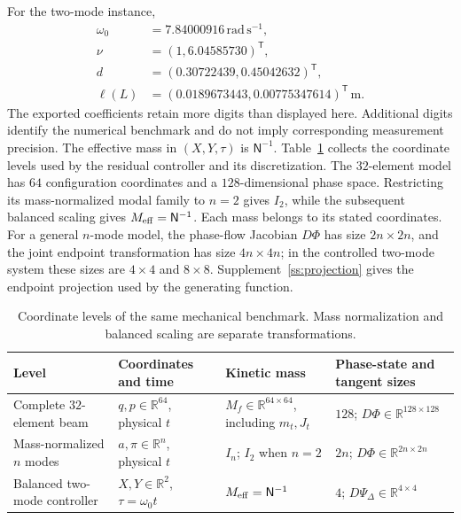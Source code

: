 For the two-mode instance,
\begin{align}
 \omega_0&=7.84000916\,\mathrm{rad\,s^{-1}},\nonumber\\
 \nu&=(1,6.04585730)^{\mathsf T},\nonumber\\
 d&=(0.30722439,0.45042632)^{\mathsf T},\nonumber\\
 \ell(L)&=(0.0189673443,0.00775347614)^{\mathsf T}\,\mathrm m.
 \label{mech:reduced-values}
\end{align}
The exported coefficients retain more digits than displayed here.
Additional digits identify the numerical benchmark and do not imply
corresponding measurement precision.
The effective mass in $(X,Y,\tau)$ is $\mathsf N^{-1}$.
Table~\ref{mech:dimension-table} collects the coordinate levels used
by the residual controller and its discretization. The $32$-element
model has $64$ configuration coordinates and a $128$-dimensional phase
space. Restricting its mass-normalized modal family to $n=2$ gives
$I_2$, while the subsequent balanced scaling gives
$M_{\rm eff}=\mathsf N^{-1}$. Each mass belongs to its stated
coordinates. For a general $n$-mode model, the phase-flow Jacobian
$D\Phi$ has size $2n\times2n$, and the joint endpoint transformation
has size $4n\times4n$; in the controlled two-mode system these sizes
are $4\times4$ and $8\times8$. Supplement~\ref{ss:projection}
gives the endpoint projection used by the generating function.

\begin{table}[t]
\centering\small
\caption{Coordinate levels of the same mechanical benchmark.
Mass normalization and balanced scaling are separate transformations.}
\label{mech:dimension-table}
\setlength{\tabcolsep}{5pt}
\begin{tabular}{p{}p{}p{}p{}}
\toprule
Level & Coordinates and time & Kinetic mass & Phase-state and tangent sizes\\
\midrule
Complete $32$-element beam & $q,p\in\mathbb R^{64}$, physical $t$ & $M_f\in\mathbb R^{64\times64}$, including $m_t,J_t$ & $128$; $D\Phi\in\mathbb R^{128\times128}$\\
Mass-normalized $n$ modes & $a,\pi\in\mathbb R^n$, physical $t$ & $I_n$; $I_2$ when $n=2$ & $2n$; $D\Phi\in\mathbb R^{2n\times2n}$\\
Balanced two-mode controller & $X,Y\in\mathbb R^2$, $\tau=\omega_0t$ & $M_{\rm eff}=\mathsf N^{-1}$ & $4$; $D\Psi_\Delta\in\mathbb R^{4\times4}$\\
\bottomrule
\end{tabular}
\end{table}

